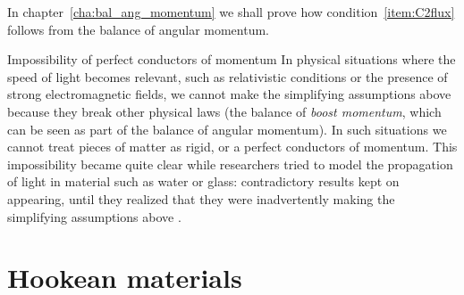 \documentclass[a4paper,12pt,%
onecolumn,oneside,%
british%
]{memoir}
\renewcommand*{\bm}[1]{\textpdfrender{TextRenderingMode=2,LineWidth=0.2pt}{\boldsymbol{#1}}}
\newcommand*{\di}{\mathop{}\!\mathrm{d}}%
\renewcommand*{\|}[1][]{\nonscript\:#1\vert\nonscript\:\mathopen{}}
\newcommand*{\chap}{chapter}%
\newcommand*{\masse}{mass-energy}
\newcommand*{\dt}{\di t}
\newcommand*{\yP}{\bm{P}}
\newcommand*{\yF}{\bm{F}}
\newcommand*{\yFa}{\yF_{a}}
\newcommand*{\yFb}{\yF_{b}}
\newcommand*{\yG}{\bm{G}}
\begin{document}
% 

In \chap~\ref{cha:bal_ang_momentum} we shall prove how condition~\ref{item:C2flux} follows from the balance of angular momentum.

\begin{extra}{Impossibility of perfect conductors of momentum}
In physical situations where the speed of light becomes relevant, such as relativistic conditions or the presence of strong electromagnetic fields, we cannot make the simplifying assumptions above because they break other physical laws (the balance of \emph{boost momentum}, which can be seen as part of the balance of angular momentum). In such situations we cannot treat pieces of matter as rigid, or a perfect conductors of momentum. This impossibility became quite clear while researchers tried to model the propagation of light in material such as water or glass: contradictory results kept on appearing, until they realized that they were inadvertently making the simplifying assumptions above \autocites{pfeiferetal2007}.
\end{extra}

\section{Hookean materials}
\label{sec:hooke}
\end{document}
